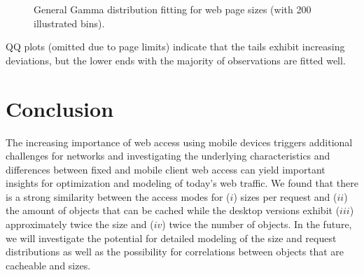 \documentclass[letterpaper,conference]{IEEEtran}
\begin{document}
\begin{figure}[t]
	\centering
	\label{fig:fbytes}

	\label{fig:mbytes}
	\caption{General Gamma distribution fitting for web page sizes (with 200 illustrated bins).\label{fig:bytes}}
\end{figure}
QQ plots (omitted due to page limits) indicate that the tails exhibit increasing deviations, but the lower ends with the majority of observations are fitted well.

\section{Conclusion}
The increasing importance of web access using mobile devices triggers additional challenges for networks and  
investigating the underlying characteristics and differences between fixed and mobile client web access can yield important insights for optimization and modeling of today's web traffic. 
We found that there is a strong similarity between the access modes for ($i$) sizes per request and ($ii$) the amount of objects that can be cached while the desktop versions exhibit ($iii$) approximately twice the size and ($iv$) twice the number of objects. In the future, we will investigate the potential for detailed modeling of the size and request distributions as well as the possibility for correlations between objects that are cacheable and sizes.

\end{document}
